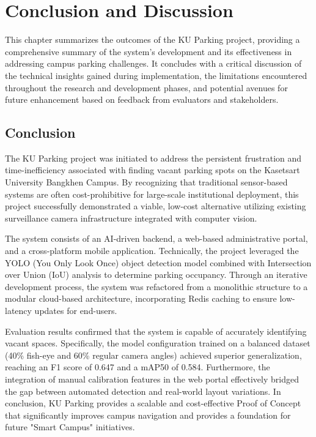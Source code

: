 \chapter{Conclusion and Discussion}
\label{chap:conclusion-discussion}
This chapter summarizes the outcomes of the KU Parking project, providing a comprehensive summary of the system's development and its effectiveness in addressing campus parking challenges. It concludes with a critical discussion of the technical insights gained during implementation, the limitations encountered throughout the research and development phases, and potential avenues for future enhancement based on feedback from evaluators and stakeholders.

\section{Conclusion}
\label{section:conclusion}
The KU Parking project was initiated to address the persistent frustration and time-inefficiency associated with finding vacant parking spots on the Kasetsart University Bangkhen Campus. By recognizing that traditional sensor-based systems are often cost-prohibitive for large-scale institutional deployment, this project successfully demonstrated a viable, low-cost alternative utilizing existing surveillance camera infrastructure integrated with computer vision.

The system consists of an AI-driven backend, a web-based administrative portal, and a cross-platform mobile application. Technically, the project leveraged the YOLO (You Only Look Once) object detection model combined with Intersection over Union (IoU) analysis to determine parking occupancy. Through an iterative development process, the system was refactored from a monolithic structure to a modular cloud-based architecture, incorporating Redis caching to ensure low-latency updates for end-users.

Evaluation results confirmed that the system is capable of accurately identifying vacant spaces. Specifically, the model configuration trained on a balanced dataset (40\% fish-eye and 60\% regular camera angles) achieved superior generalization, reaching an F1 score of 0.647 and a mAP50 of 0.584. Furthermore, the integration of manual calibration features in the web portal effectively bridged the gap between automated detection and real-world layout variations. In conclusion, KU Parking provides a scalable and cost-effective Proof of Concept that significantly improves campus navigation and provides a foundation for future "Smart Campus" initiatives.

